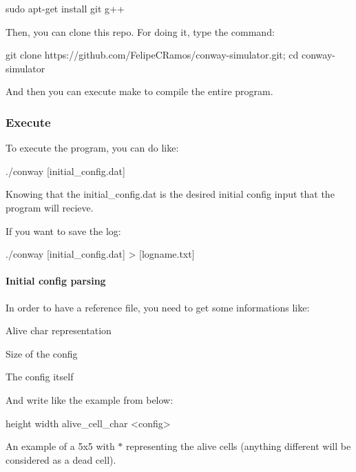 \begin{DoxyCode}
sudo apt-get install git g++
\end{DoxyCode}


Then, you can clone this repo. For doing it, type the command\+:


\begin{DoxyCode}
git clone https://github.com/FelipeCRamos/conway-simulator.git;
cd conway-simulator
\end{DoxyCode}
 And then you can execute {\ttfamily make} to compile the entire program.

\subsubsection*{Execute}

To execute the program, you can do like\+:


\begin{DoxyCode}
./conway [initial\_config.dat]
\end{DoxyCode}


Knowing that the {\ttfamily initial\+\_\+config.\+dat} is the desired initial config input that the program will recieve.

If you want to save the log\+:


\begin{DoxyCode}
./conway [initial\_config.dat] > [logname.txt]
\end{DoxyCode}


\paragraph*{Initial config parsing}

In order to have a reference file, you need to get some informations like\+:


\begin{DoxyItemize}
\item Alive {\ttfamily char} representation
\item Size of the config
\item The config itself
\end{DoxyItemize}

And write like the example from below\+:


\begin{DoxyCode}
height width
alive\_cell\_char
<config>
\end{DoxyCode}


An example of a 5x5 with {\ttfamily $\ast$} representing the alive cells (anything different will be considered as a dead cell).



